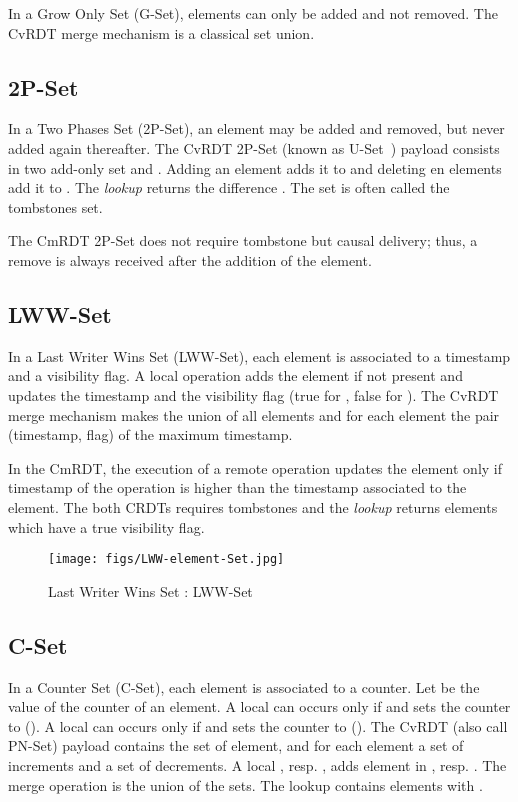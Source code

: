 \documentclass[a4paper]{article}
\begin{document}
In a Grow Only Set (G-Set), elements can only be added and not
removed. The CvRDT merge mechanism is a classical set union.

\subsection{2P-Set}

In a Two Phases Set (2P-Set), an element may be added and removed, but
never added again thereafter. The CvRDT 2P-Set (known as
U-Set~\cite{wuu84efficient}) payload consists in two add-only set 
and . Adding an element adds it to  and deleting en elements add
it to . The {\em lookup} returns the difference . The set  is often called the tombstones set. 

The CmRDT 2P-Set does not require tombstone but causal delivery; thus,
a remove is always received after the addition of the element.

\subsection{LWW-Set}

In a Last Writer Wins Set (LWW-Set), each element is associated to a
timestamp and a visibility flag.  A local operation adds the element
if not present and updates the timestamp and the visibility flag (true
for , false for ). The CvRDT merge mechanism makes the union
of all elements and for each element the pair (timestamp, flag) of the
maximum timestamp.

In the CmRDT, the execution of a remote operation updates the element
only if timestamp of the operation is higher than the timestamp
associated to the element. The both CRDTs requires tombstones and the
{\em lookup} returns elements which have a true visibility flag.

\begin{figure}[H] 
\centering
\texttt{[image: figs/LWW-element-Set.jpg]} 
\caption{Last Writer Wins Set : LWW-Set~\cite{shapiro11comprehensive}}
\label{fig:LWW} 
\end{figure} 

\subsection{C-Set}

In a Counter Set (C-Set), each element is associated to a counter. Let
 be the value of the counter of an element. A local  can
occurs only if  and sets the counter to  (). A local  can occurs only if  and sets the counter
to  (). The CvRDT (also call PN-Set) payload contains
the set of element, and for each element a set  of increments and a
set  of decrements. A local , resp. , adds 
element in , resp. . The merge operation is the union of the
sets. The lookup contains elements with .
\end{document}
